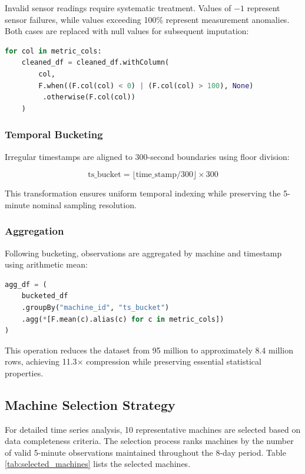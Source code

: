 \documentclass[12pt]{report}
\begin{document}
Invalid sensor readings require systematic treatment. Values of $-1$ represent sensor failures, while values exceeding 100\% represent measurement anomalies. Both cases are replaced with null values for subsequent imputation:

\begin{lstlisting}[language=Python, caption={Invalid Value Scrubbing}]
for col in metric_cols:
    cleaned_df = cleaned_df.withColumn(
        col,
        F.when((F.col(col) < 0) | (F.col(col) > 100), None)
         .otherwise(F.col(col))
    )
\end{lstlisting}

\subsubsection{Temporal Bucketing}

Irregular timestamps are aligned to 300-second boundaries using floor division:

\begin{equation}
\text{ts\_bucket} = \lfloor \text{time\_stamp} / 300 \rfloor \times 300
\end{equation}

This transformation ensures uniform temporal indexing while preserving the 5-minute nominal sampling resolution.

\subsubsection{Aggregation}

Following bucketing, observations are aggregated by machine and timestamp using arithmetic mean:

\begin{lstlisting}[language=Python, caption={GroupBy Aggregation}]
agg_df = (
    bucketed_df
    .groupBy("machine_id", "ts_bucket")
    .agg(*[F.mean(c).alias(c) for c in metric_cols])
)
\end{lstlisting}

This operation reduces the dataset from 95 million to approximately 8.4 million rows, achieving 11.3$\times$ compression while preserving essential statistical properties.

\subsection{Machine Selection Strategy}

For detailed time series analysis, 10 representative machines are selected based on data completeness criteria. The selection process ranks machines by the number of valid 5-minute observations maintained throughout the 8-day period. Table \ref{tab:selected_machines} lists the selected machines.
\end{document}
